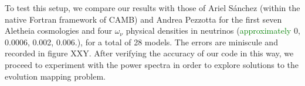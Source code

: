 To test this setup, we compare our results with those of Ariel S\'{a}nchez 
(within the native Fortran framework of CAMB) and Andrea Pezzotta for the
first seven Aletheia cosmologies and four $\omega_\nu$ physical densities in
neutrinos (\textcolor{green}{approximately} 0, 0.0006, 0.002, 0.006.), for a 
total of 28
models. The errors are miniscule and recorded in figure XXY. After verifying
the accuracy of our code in this way, we proceed to experiment with the power
spectra in order to explore solutions to the evolution mapping problem.


